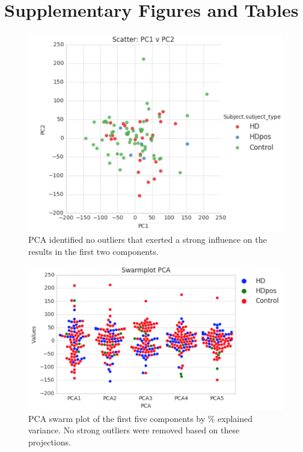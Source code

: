 \documentclass[fleqn,10pt,table]{wlscirep}
\begin{document}
\section*{Supplementary Figures and Tables}


\begin{figure}[ht]
\includegraphics[width=0.5\linewidth]{PCA.png}
\caption{PCA identified no outliers that exerted a strong influence on the results in the first two components.}
\end{figure}

\begin{figure}[ht]
\includegraphics[width=0.5\linewidth]{PCA_swarm.png}
\caption{PCA swarm plot of the first five components by \% explained variance.
No strong outliers were removed based on these projections.
}
\end{figure}
\end{document}
